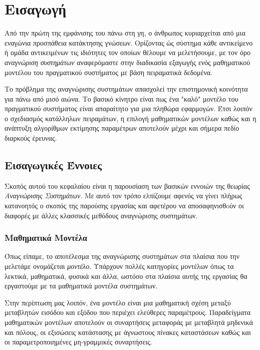 \chapter{Εισαγωγή}

Από την πρώτη της εμφάνισης του πάνω στη γη, ο άνθρωπος κυριαρχείται από μια εναγώνια προσπάθεια κατάκτησης γνώσεων. Ορίζοντας ώς σύστημα κάθε αντικείμενο ή ομάδα αντικειμένων τις ιδιότητες τον οποίων θέλουμε να μελετήσουμε, με τον όρο \textit{αναγνώριση συστημάτων} αναφερόμαστε στην διαδικασία εξαγωγής ενός μαθηματικού μοντέλου του πραγματικού συστήματος με βάση πειραματικά δεδομένα. 

Το πρόβλημα της αναγνώρισης συστημάτων απασχολεί την επιστημονική κοινότητα για πάνω από μισό αιώνα. Το βασικό κίνητρο είναι πως ένα "καλό" μοντέλο του πραγματικού συστήματος είναι απαραίτητο για μια πληθώρα εφαρμογών. Έτσι λοιπόν ο σχεδιασμός κατάλληλων πειραμάτων, η επιλογή μαθηματικών μοντέλων καθώς και η ανάπτυξη αλγορίθμων εκτίμησης παραμέτρων αποτελούν  μέχρι και σήμερα πεδίο διαρκούς έρευνας.

\section{Εισαγωγικές Έννοιες}
Σκοπός αυτού του κεφαλαίου είναι η παρουσίαση των βασικών εννοιών της θεωρίας \textit{Αναγνώρισης Συστημάτων}. Με αυτό τον τρόπο ελπίζουμε αφενός να γίνει πλήρως κατανοητός ο σκοπός της παρούσης εργασίας και αφετέρου να αποσαφηνισθoύν οι διαφορές με άλλες κλασσικές μεθόδους αναγνώρισης συστημάτων.

\subsection{Μαθηματικά Μοντέλα}
Όπως είπαμε, το αποτέλεσμα της αναγνώρισης συστημάτων στα πλαίσια που την μελετάμε ονομάζεται \textit{μοντέλο}. Υπάρχουν πολλές κατηγορίες μοντέλων όπως τα λεκτικά, μαθηματικά, φυσικά και άλλα, ωστόσο στα πλαίσια αυτής της εργασίας θα εργαστούμε με τα μαθηματικά μοντέλα συστημάτων.

Στην περίπτωση μας λοιπόν, ένα μοντέλο είναι μια μαθηματική σχέση μεταξύ μεταβλητών εισόδου και εξόδου που περιέχει ελεύθερες παραμέτρους. Παραδείγματα μαθηματικών μοντέλων αποτελούν οι συναρτήσεις μεταφοράς με μεταβλητά μηδενικά και πόλους, οι εξισώσεις κατάστασης με άγνωστους πίνακες καταστάσεων καθώς και οι παραμετροποιημένες μη-γραμμικές συναρτήσεις.

